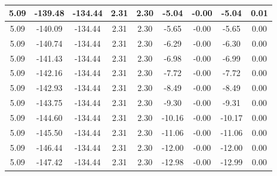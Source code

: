 \begin{table}[htbp]
\begin{adjustbox}{angle=90}
\begin{tabular}{|c|c|c|c|c|c|c|c|c|}
 5.09 & -139.48 & -134.44 & 2.31 & 2.30 & -5.04 & -0.00 & -5.04 & 0.01\\ \hline
 5.09 & -140.09 & -134.44 & 2.31 & 2.30 & -5.65 & -0.00 & -5.65 & 0.00\\ \hline
 5.09 & -140.74 & -134.44 & 2.31 & 2.30 & -6.29 & -0.00 & -6.30 & 0.00\\ \hline
 5.09 & -141.43 & -134.44 & 2.31 & 2.30 & -6.98 & -0.00 & -6.99 & 0.00\\ \hline
 5.09 & -142.16 & -134.44 & 2.31 & 2.30 & -7.72 & -0.00 & -7.72 & 0.00\\ \hline
 5.09 & -142.93 & -134.44 & 2.31 & 2.30 & -8.49 & -0.00 & -8.49 & 0.00\\ \hline
 5.09 & -143.75 & -134.44 & 2.31 & 2.30 & -9.30 & -0.00 & -9.31 & 0.00\\ \hline
 5.09 & -144.60 & -134.44 & 2.31 & 2.30 & -10.16 & -0.00 & -10.17 & 0.00\\ \hline
 5.09 & -145.50 & -134.44 & 2.31 & 2.30 & -11.06 & -0.00 & -11.06 & 0.00\\ \hline
 5.09 & -146.44 & -134.44 & 2.31 & 2.30 & -12.00 & -0.00 & -12.00 & 0.00\\ \hline
 5.09 & -147.42 & -134.44 & 2.31 & 2.30 & -12.98 & -0.00 & -12.99 & 0.00\\ \hline
            \end{tabular}
        \end{adjustbox}
        \caption{}
        \label{}
    \end{table}
    